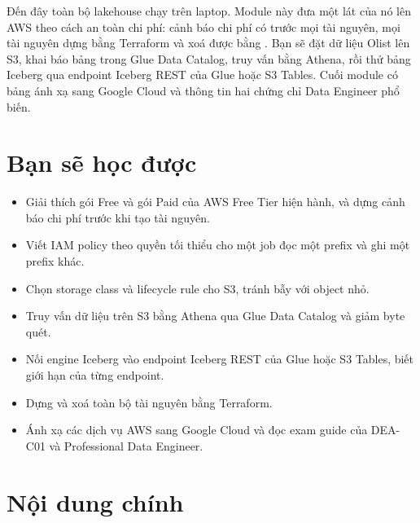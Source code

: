 
Đến đây toàn bộ lakehouse chạy trên laptop. Module này đưa một lát của nó lên AWS theo cách an toàn chi phí: cảnh báo chi phí có trước mọi tài nguyên, mọi tài nguyên dựng bằng Terraform và xoá được bằng . Bạn sẽ đặt dữ liệu Olist lên S3, khai báo bảng trong Glue Data Catalog, truy vấn bằng Athena, rồi thử bảng Iceberg qua endpoint Iceberg REST của Glue hoặc S3 Tables. Cuối module có bảng ánh xạ sang Google Cloud và thông tin hai chứng chỉ Data Engineer phổ biến.

\section{Bạn sẽ học được}
\begin{itemize}
  \item Giải thích gói Free và gói Paid của AWS Free Tier hiện hành, và dựng cảnh báo chi phí trước khi tạo tài nguyên.
  \item Viết IAM policy theo quyền tối thiểu cho một job đọc một prefix và ghi một prefix khác.
  \item Chọn storage class và lifecycle rule cho S3, tránh bẫy với object nhỏ.
  \item Truy vấn dữ liệu trên S3 bằng Athena qua Glue Data Catalog và giảm byte quét.
  \item Nối engine Iceberg vào endpoint Iceberg REST của Glue hoặc S3 Tables, biết giới hạn của từng endpoint.
  \item Dựng và xoá toàn bộ tài nguyên bằng Terraform.
  \item Ánh xạ các dịch vụ AWS sang Google Cloud và đọc exam guide của DEA-C01 và Professional Data Engineer.
\end{itemize}

\section{Nội dung chính}

